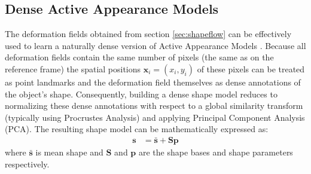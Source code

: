 

\subsection{Dense Active Appearance Models}

The deformation fields obtained from section \ref{sec:shapeflow} can be effectively used to learn a naturally dense version of Active Appearance Models \cite{Cootes2001, Matthews2004}. Because all deformation fields contain the same number of pixels (the same as on the reference frame) the spatial positions $\bm{x}_i=(x_i, y_i)$ of these pixels can be treated as point landmarks and the deformation field themselves as dense annotations of the object's shape. Consequently, building a dense shape model reduces to normalizing these dense annotations with respect to a global similarity transform (typically using Procrustes Analysis) and applying Principal Component Analysis (PCA). The resulting shape model can be mathematically expressed as:
\begin{equation}
    \begin{aligned}
        \bm{s} & = \bm{\bar{s}} + \bm{S} \bm{p}
    \end{aligned}
    \label{eq:shape_model}
\end{equation}
where $\bm{\bar{s}}$ is mean shape and $\bm{S}$ and $\bm{p}$ are the shape bases and shape parameters respectively.

